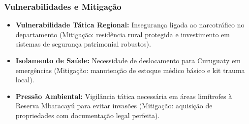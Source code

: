 \subsubsection{Vulnerabilidades e
Mitigação}

\begin{itemize}
\tightlist
\item
  \textbf{Vulnerabilidade Tática Regional:} Insegurança ligada ao
  narcotráfico no departamento (Mitigação: residência rural protegida e
  investimento em sistemas de segurança patrimonial robustos).
\item
  \textbf{Isolamento de Saúde:} Necessidade de deslocamento para
  Curuguaty em emergências (Mitigação: manutenção de estoque médico
  básico e kit trauma local).
\item
  \textbf{Pressão Ambiental:} Vigilância tática necessária em áreas
  limítrofes à Reserva Mbaracayú para evitar invasões (Mitigação:
  aquisição de propriedades com documentação legal perfeita).
\end{itemize}

